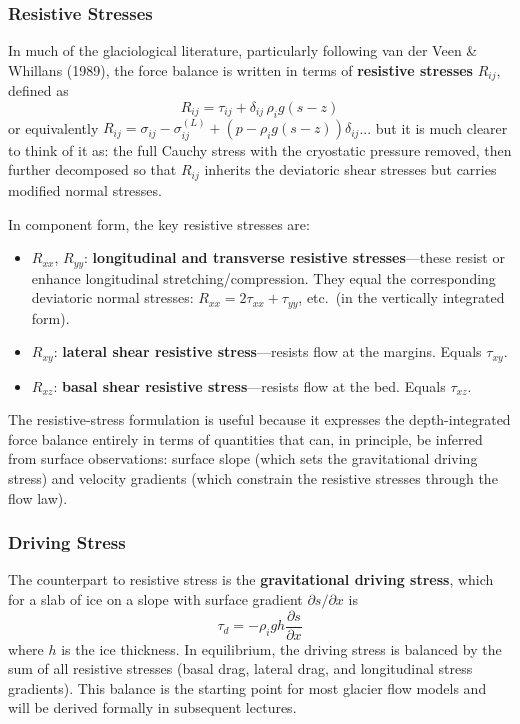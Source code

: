 \documentclass[11pt]{article}
\begin{document}
\subsubsection*{Resistive Stresses}

In much of the glaciological literature, particularly following van der Veen \& Whillans (1989), the force balance is written in terms of \textbf{resistive stresses} $R_{ij}$, defined as
\begin{equation}
  \boxed{R_{ij} = \tau_{ij} + \delta_{ij}\,\rho_i g (s - z)}
\end{equation}
or equivalently $R_{ij} = \sigma_{ij} - \sigma_{ij}^{(L)} + (p - \rho_i g(s-z))\delta_{ij}$... but it is much clearer to think of it as: the full Cauchy stress with the cryostatic pressure removed, then further decomposed so that $R_{ij}$ inherits the deviatoric shear stresses but carries modified normal stresses.

In component form, the key resistive stresses are:
\begin{itemize}
  \item $R_{xx}$, $R_{yy}$: \textbf{longitudinal and transverse resistive stresses}---these resist or enhance longitudinal stretching/compression.  They equal the corresponding deviatoric normal stresses: $R_{xx} = 2\tau_{xx} + \tau_{yy}$, etc.\ (in the vertically integrated form).
  \item $R_{xy}$: \textbf{lateral shear resistive stress}---resists flow at the margins.  Equals $\tau_{xy}$.
  \item $R_{xz}$: \textbf{basal shear resistive stress}---resists flow at the bed.  Equals $\tau_{xz}$.
\end{itemize}

The resistive-stress formulation is useful because it expresses the depth-integrated force balance entirely in terms of quantities that can, in principle, be inferred from surface observations: surface slope (which sets the gravitational driving stress) and velocity gradients (which constrain the resistive stresses through the flow law).

\subsubsection*{Driving Stress}

The counterpart to resistive stress is the \textbf{gravitational driving stress}, which for a slab of ice on a slope with surface gradient $\partial s/\partial x$ is
\begin{equation}
  \tau_d = -\rho_i g h \frac{\partial s}{\partial x}
\end{equation}
where $h$ is the ice thickness.  In equilibrium, the driving stress is balanced by the sum of all resistive stresses (basal drag, lateral drag, and longitudinal stress gradients).  This balance is the starting point for most glacier flow models and will be derived formally in subsequent lectures.
\end{document}
